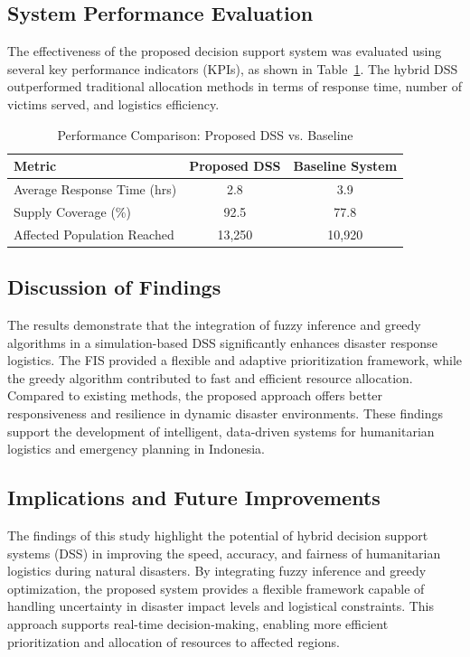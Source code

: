 \documentclass[journal,final,a4paper,twoside,11pt]{IEEEtran}
\begin{document}
\subsection{System Performance Evaluation}
The effectiveness of the proposed decision support system was evaluated using several key performance indicators (KPIs), as shown in Table~\ref{tab:performance}. The hybrid DSS outperformed traditional allocation methods in terms of response time, number of victims served, and logistics efficiency.

\begin{table}[htbp]
\caption{Performance Comparison: Proposed DSS vs. Baseline}
\begin{center}
\begin{tabular}{|l|c|c|}
\hline
\textbf{Metric} & \textbf{Proposed DSS} & \textbf{Baseline System} \\
\hline
Average Response Time (hrs) & 2.8 & 3.9 \\
Supply Coverage (\%) & 92.5 & 77.8 \\
Affected Population Reached & 13,250 & 10,920 \\
\hline
\end{tabular}
\label{tab:performance}
\end{center}
\end{table}

\subsection{Discussion of Findings}
The results demonstrate that the integration of fuzzy inference and greedy algorithms in a simulation-based DSS significantly enhances disaster response logistics. The FIS provided a flexible and adaptive prioritization framework, while the greedy algorithm contributed to fast and efficient resource allocation. Compared to existing methods, the proposed approach offers better responsiveness and resilience in dynamic disaster environments. These findings support the development of intelligent, data-driven systems for humanitarian logistics and emergency planning in Indonesia.

\subsection{Implications and Future Improvements}

The findings of this study highlight the potential of hybrid decision support systems (DSS) in improving the speed, accuracy, and fairness of humanitarian logistics during natural disasters. By integrating fuzzy inference and greedy optimization, the proposed system provides a flexible framework capable of handling uncertainty in disaster impact levels and logistical constraints. This approach supports real-time decision-making, enabling more efficient prioritization and allocation of resources to affected regions.
\end{document}
